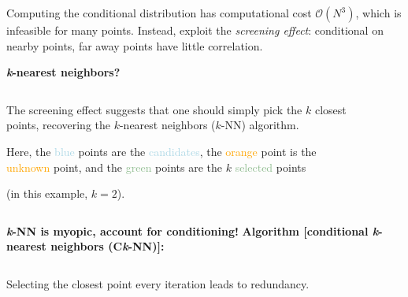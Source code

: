 \documentclass{beamer}                             %
\newcommand{\blocktitle}[1]{{\Large \textbf{#1}}}
\newcommand*{\BigO}{\mathcal{O}}
\begin{document}
\begin{frame}[t]
\begin{columns}[T]
\begin{column}{0.30\textwidth}
\begin{tcolorbox}
    Computing the conditional distribution has computational
    cost \( \BigO(N^3) \), which is infeasible for many points.
    Instead, exploit the \emph{screening effect}: conditional
    on nearby points, far away points have little correlation.
    \begin{figure}[t]
      \centering
      
      \label{fig:screening}
    \end{figure}
  \end{tcolorbox}

  \begin{tcolorbox}
    \blocktitle{\textit{k}-nearest neighbors?}
    \vspace{0.25\baselineskip}

    \begin{columns}
      \begin{column}{0.5\textwidth}
        The screening effect suggests that one should simply
        pick the \( k \) closest points, recovering the
        \( k \)-nearest neighbors (\( k \)-NN) algorithm.

        \vspace{\baselineskip}
        Here, the \textcolor{lightblue}{blue} points are the
        \textcolor{lightblue}{candidates}, the \textcolor{orange}{orange}
        point is the \textcolor{orange}{unknown} point, and the
        \textcolor{darkseagreen}{green} points are the \( k \)
        \textcolor{darkseagreen}{selected} points

        (in this example, \( k = 2 \)).
      \end{column}
      \begin{column}{0.5\textwidth}
        \begin{figure}[t]
          \centering
          
          \label{fig:selection_knn}
        \end{figure}
      \end{column}
    \end{columns}
  \end{tcolorbox}

  \begin{tcolorbox}
    \blocktitle{\textit{k}-NN is myopic, account for conditioning!}
    \textbf{
      Algorithm [conditional \textit{k}-nearest neighbors (C\textit{k}-NN)]:
    }
    \vspace{-0.5\baselineskip}
    \begin{columns}
      \begin{column}{0.5\textwidth}
        Selecting the closest point every iteration leads to redundancy.


\end{column}
\end{columns}
\end{tcolorbox}
\end{column}
\end{columns}
\end{frame}
\end{document}
